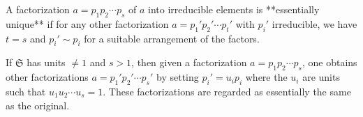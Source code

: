 A factorization $a = p_1 p_2 \cdots p_s$ of $a$ into irreducible elements is **essentially unique** if for any other factorization $a = p_1' p_2' \cdots p_t'$ with $p_i'$ irreducible, we have $t = s$ and $p_i' \sim p_i$ for a suitable arrangement of the factors.

If $\mathfrak{S}$ has units $\neq 1$ and $s > 1$, then given a factorization $a = p_1 p_2 \cdots p_s$, one obtains other factorizations $a = p_1' p_2' \cdots p_s'$ by setting $p_i' = u_i p_i$ where the $u_i$ are units such that $u_1 u_2 \cdots u_s = 1$. These factorizations are regarded as essentially the same as the original.
